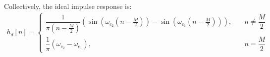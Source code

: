 Collectively, the ideal impulse response is:
\begin{align*}
h_d[n] = \begin{cases}
\dfrac{1}{\pi \left( n - \frac{M}{2}\right)} \left( \sin\left( \omega_{c_2} \left( n - \frac{M}{2} \right) \right) - \sin \left( \omega_{c_1} \left( n - \frac{M}{2} \right) \right) \right), \quad &n \neq \dfrac{M}{2} \\
\dfrac{1}{\pi} ( \omega_{c_2} - \omega_{c_1}), \quad &n = \dfrac{M}{2}
\end{cases}
\end{align*}

\clearpage


\clearpage

